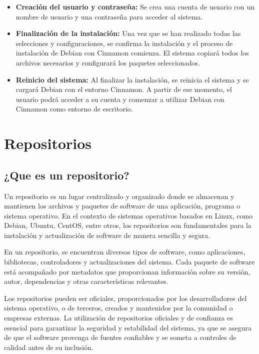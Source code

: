 \begin{itemize}
				\item \textbf{Creación del usuario y contraseña:} Se crea una cuenta de usuario con un nombre de usuario y una contraseña para acceder al sistema.
					
				\item \textbf{Finalización de la instalación:} Una vez que se han realizado todas las selecciones y configuraciones, se confirma la instalación y el proceso de instalación de Debian con Cinnamon comienza. El sistema copiará todos los archivos necesarios y configurará los paquetes seleccionados.
					
				\item \textbf{Reinicio del sistema:} Al finalizar la instalación, se reinicia el sistema y se cargará Debian con el entorno Cinnamon. A partir de ese momento, el usuario podrá acceder a su cuenta y comenzar a utilizar Debian con Cinnamon como entorno de escritorio.
			
		\end{itemize}
	
	\section{Repositorios}
	
		\subsection{¿Que es un repositorio?}
		
			Un repositorio es un lugar centralizado y organizado donde se almacenan y mantienen los archivos y paquetes de software de una aplicación, programa o sistema operativo. En el contexto de sistemas operativos basados en Linux, como Debian, Ubuntu, CentOS, entre otros, los repositorios son fundamentales para la instalación y actualización de software de manera sencilla y segura.
			
			En un repositorio, se encuentran diversos tipos de software, como aplicaciones, bibliotecas, controladores y actualizaciones del sistema. Cada paquete de software está acompañado por metadatos que proporcionan información sobre su versión, autor, dependencias y otras características relevantes.
			
			Los repositorios pueden ser oficiales, proporcionados por los desarrolladores del sistema operativo, o de terceros, creados y mantenidos por la comunidad o empresas externas. La utilización de repositorios oficiales y de confianza es esencial para garantizar la seguridad y estabilidad del sistema, ya que se asegura de que el software provenga de fuentes confiables y se someta a controles de calidad antes de su inclusión.\par
			
